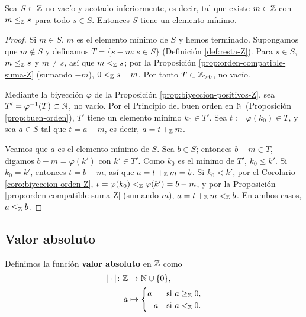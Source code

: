 \documentclass[12pt,a4paper]{book}
\begin{document}
    \begin{teorema}
        \label{thm:buen-orden-Z}
        Sea $S\subset\mathbb{Z}$ no vacío y acotado inferiormente, es decir, tal que existe $m\in\mathbb{Z}$ con $m\le_{\mathbb{Z}}s$ para todo $s\in S$. Entonces $S$ tiene un elemento mínimo.
    \end{teorema}
    \begin{proof}
        Si $m\in S$, $m$ es el elemento mínimo de $S$ y hemos terminado. Supongamos que $m\notin S$ y definamos $T=\{s-m : s\in S\}$ (Definición \ref{def:resta-Z}). Para $s\in S$, $m\le_{\mathbb{Z}}s$ y $m\neq s$, así que $m<_{\mathbb{Z}}s$; por la Proposición \ref{prop:orden-compatible-suma-Z} (sumando $-m$), $0<_{\mathbb{Z}}s-m$. Por tanto $T\subset\mathbb{Z}_{>0}$, no vacío.

        Mediante la biyección $\varphi$ de la Proposición \ref{prop:biyeccion-positivos-Z}, sea $T'=\varphi^{-1}(T)\subset\mathbb{N}$, no vacío. Por el Principio del buen orden en $\mathbb{N}$ (Proposición \ref{prop:buen-orden}), $T'$ tiene un elemento mínimo $k_{0}\in T'$. Sea $t:=\varphi(k_{0})\in T$, y sea $a\in S$ tal que $t=a-m$, es decir, $a=t+_{\mathbb{Z}}m$.

        Veamos que $a$ es el elemento mínimo de $S$. Sea $b\in S$; entonces $b-m\in T$, digamos $b-m=\varphi(k')$ con $k'\in T'$. Como $k_{0}$ es el mínimo de $T'$, $k_{0}\le k'$. Si $k_{0}=k'$, entonces $t=b-m$, así que $a=t+_{\mathbb{Z}}m=b$. Si $k_{0}<k'$, por el Corolario \ref{coro:biyeccion-orden-Z}, $t=\varphi(k_{0})<_{\mathbb{Z}}\varphi(k')=b-m$, y por la Proposición \ref{prop:orden-compatible-suma-Z} (sumando $m$), $a=t+_{\mathbb{Z}}m<_{\mathbb{Z}}b$. En ambos casos, $a\le_{\mathbb{Z}}b$.
    \end{proof}

    \subsection{Valor absoluto}

    \begin{definicion}
        \label{def:valor-absoluto-Z}
        Definimos la función \textbf{valor absoluto} en $\mathbb{Z}$ como
        \begin{align*}
            |\cdot|\colon\mathbb{Z}&\to\mathbb{N}\cup\{0\},\\
            a&\mapsto\begin{cases} a & \text{si } a\ge_{\mathbb{Z}}0,\\ -a & \text{si } a<_{\mathbb{Z}}0.\end{cases}
        \end{align*}
    \end{definicion}
\end{document}
